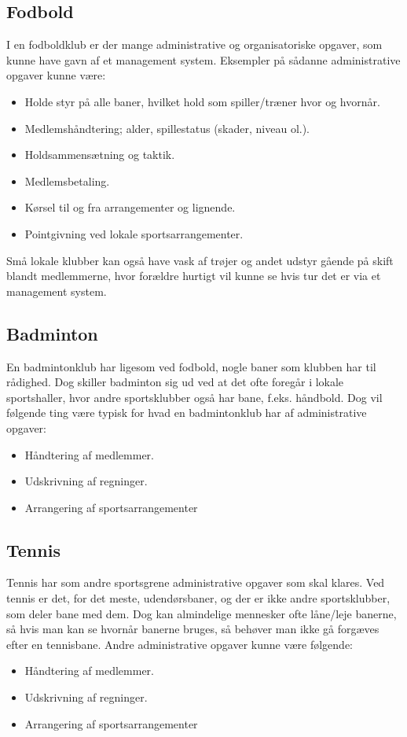 \subsection{Fodbold}
I en fodboldklub er der mange administrative og organisatoriske opgaver, som kunne have gavn af et management system. Eksempler på sådanne administrative opgaver kunne være:
\begin{itemize}
\item Holde styr på alle baner, hvilket hold som spiller/træner hvor og hvornår.
\item Medlemshåndtering; alder, spillestatus (skader, niveau ol.).
\item Holdsammensætning og taktik.
\item Medlemsbetaling.
\item Kørsel til og fra arrangementer og lignende.
\item Pointgivning ved lokale sportsarrangementer.
\end{itemize}
Små lokale klubber kan også have vask af trøjer og andet udstyr gående på skift blandt medlemmerne, hvor forældre hurtigt vil kunne se hvis tur det er via et management system. 

\subsection{Badminton}
En badmintonklub har ligesom ved fodbold, nogle baner som klubben har til rådighed. Dog skiller badminton sig ud ved at det ofte foregår i lokale sportshaller, hvor andre sportsklubber også har bane, f.eks. håndbold. Dog vil følgende ting være typisk for hvad en badmintonklub har af administrative opgaver:
\begin{itemize}
\item Håndtering af medlemmer.
\item Udskrivning af regninger.
\item Arrangering af sportsarrangementer
\end{itemize}

\subsection{Tennis}
Tennis har som andre sportsgrene administrative opgaver som skal klares. Ved tennis er det, for det meste, udendørsbaner, og der er ikke andre sportsklubber, som deler bane med dem. Dog kan almindelige mennesker ofte låne/leje banerne, så hvis man kan se hvornår banerne bruges, så behøver man ikke gå forgæves efter en tennisbane.
Andre administrative opgaver kunne være følgende:
\begin{itemize}
\item Håndtering af medlemmer.
\item Udskrivning af regninger.
\item Arrangering af sportsarrangementer
\end{itemize}

